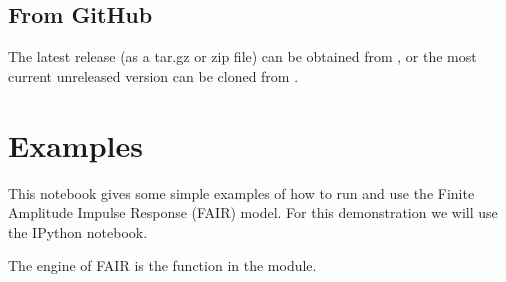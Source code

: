 \documentclass[letterpaper,10pt,english]{sphinxmanual}
\begin{document}
\section{From GitHub}
\label{\detokenize{installation:from-github}}
The latest release (as a tar.gz or zip file) can be obtained from , or the most current unreleased version can be cloned from .


\chapter{Examples}
\label{\detokenize{examples::doc}}\label{\detokenize{examples:examples}}
This notebook gives some simple examples of how to run and use the
Finite Amplitude Impulse Response (FAIR) model. For this demonstration
we will use the IPython notebook.

\begin{sphinxVerbatim}[commandchars=\\\{\}]
 
\end{sphinxVerbatim}

\begin{sphinxVerbatim}[commandchars=\\\{\}]
 

   

     
\PYG{p}{[}\PYG{p}{]}   
\end{sphinxVerbatim}

The \sphinxquotedblleft{}engine\sphinxquotedblright{} of FAIR is the  function in the 
module.

\begin{sphinxVerbatim}[commandchars=\\\{\}]
   
\end{sphinxVerbatim}
\end{document}
